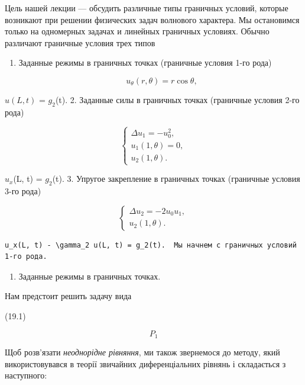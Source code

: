\documentclass[
  ukrainian,
]{article}
\providecommand{\tightlist}{%
  \setlength{\itemsep}{0pt}\setlength{\parskip}{0pt}}
\begin{document}
Цель нашей лекции --- обсудить различные типы граничных условий, которые
возникают при решении физических задач волнового характера. Мы
остановимся только на одномерных задачах и линейных граничных условиях.
Обычно различают граничные условия трех типов

\begin{enumerate}
\def\labelenumi{\arabic{enumi}.}
\tightlist
\item
  Заданные режимы в граничных точках (граничные условия 1-го рода)
\end{enumerate}

\[
\qquad u_{\theta}(r, \theta) = r \cos \theta,
\]

\(u(L, t)\) = \(g_2\)(t). 2. Заданные силы в граничных точках (граничные
условия 2-го рода)

\[
\begin{cases} \Delta u_{1} = -u_{0}^{2}, \\ u_{1}(1, \theta) = 0, \\ u_{2}(1, \theta). \end{cases}
\]

\(u_x\)(L, t) = \(g_2\)(t). 3. Упругое закрепление в граничных точках
(граничные условия 3-го рода)

\[
\begin{cases} \Delta u_{2} = -2u_{0}u_{1}, \\ u_{2}(1, \theta). \end{cases}
\]

\begin{verbatim}
u_x(L, t) - \gamma_2 u(L, t) = g_2(t).  Мы начнем с граничных условий 1-го рода.
\end{verbatim}

\begin{enumerate}
\def\labelenumi{\arabic{enumi}.}
\tightlist
\item
  Заданные режимы в граничных точках.
\end{enumerate}

Нам предстоит решить задачу вида

(19.1)

\[
P_{1}
\]

Щоб розв'язати \emph{неоднорідне рівняння}, ми також звернемося до
методу, який використовувався в теорії звичайних диференціальних рівнянь
і складається з наступного:
\end{document}
